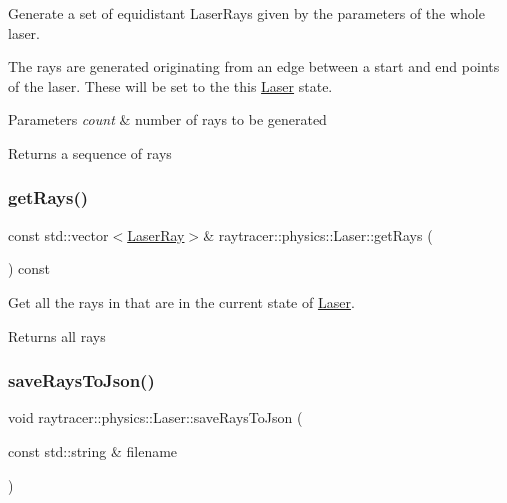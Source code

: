Generate a set of equidistant Laser\+Rays given by the parameters of the whole laser. 

The rays are generated originating from an edge between a start and end points of the laser. These will be set to the this \hyperlink{classraytracer_1_1physics_1_1Laser}{Laser} state.


\begin{DoxyParams}{Parameters}
{\em count} & number of rays to be generated \\
\hline
\end{DoxyParams}
\begin{DoxyReturn}{Returns}
a sequence of rays 
\end{DoxyReturn}
\mbox{\label{classraytracer_1_1physics_1_1Laser_af35cc781f5f6b39bfa9e25369a63a856}} 
\subsubsection{\texorpdfstring{get\+Rays()}{getRays()}}
{\footnotesize\ttfamily const std\+::vector$<$\hyperlink{structraytracer_1_1physics_1_1LaserRay}{Laser\+Ray}$>$\& raytracer\+::physics\+::\+Laser\+::get\+Rays (\begin{DoxyParamCaption}{ }\end{DoxyParamCaption}) const}



Get all the rays in that are in the current state of \hyperlink{classraytracer_1_1physics_1_1Laser}{Laser}. 

\begin{DoxyReturn}{Returns}
all rays 
\end{DoxyReturn}
\mbox{\label{classraytracer_1_1physics_1_1Laser_adfb22ae48261bdc37db1f36fca20065f}} 
\subsubsection{\texorpdfstring{save\+Rays\+To\+Json()}{saveRaysToJson()}}
{\footnotesize\ttfamily void raytracer\+::physics\+::\+Laser\+::save\+Rays\+To\+Json (\begin{DoxyParamCaption}\item[{const std\+::string \&}]{filename }\end{DoxyParamCaption})}



